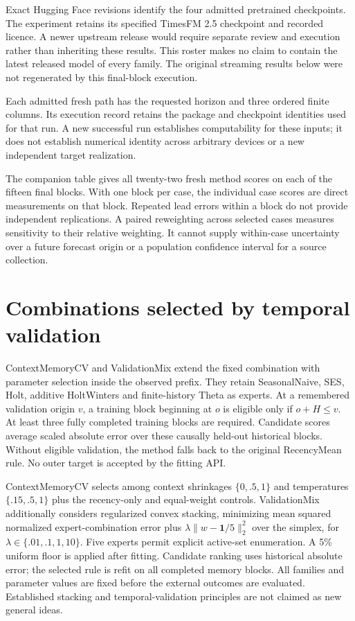 \documentclass[11pt,a4paper]{article}
\begin{document}
Exact Hugging Face revisions identify the four admitted pretrained checkpoints. The experiment retains its specified TimesFM 2.5 checkpoint and recorded licence. A newer upstream release would require separate review and execution rather than inheriting these results. This roster makes no claim to contain the latest released model of every family. The original streaming results below were not regenerated by this final-block execution.

Each admitted fresh path has the requested horizon and three ordered finite columns. Its execution record retains the package and checkpoint identities used for that run. A new successful run establishes computability for these inputs; it does not establish numerical identity across arbitrary devices or a new independent target realization.



The companion table  gives all twenty-two
fresh method scores on each of the fifteen final blocks. With one block per
case, the individual case scores are direct measurements on that block.
Repeated lead errors within a block do not provide independent replications.
A paired reweighting across selected cases measures sensitivity to their
relative weighting. It cannot supply within-case uncertainty over a future
forecast origin or a population confidence interval for a source collection.

\section{Combinations selected by temporal validation}
\label{sec:temporal-validation}
ContextMemoryCV and ValidationMix extend the fixed combination with parameter selection inside the observed prefix. They retain SeasonalNaive, SES, Holt, additive HoltWinters and finite-history Theta as experts. At a remembered validation origin $v$, a training block beginning at $o$ is eligible only if $o+H\le v$. At least three fully completed training blocks are required. Candidate scores average scaled absolute error over these causally held-out historical blocks. Without eligible validation, the method falls back to the original RecencyMean rule. No outer target is accepted by the fitting API.

ContextMemoryCV selects among context shrinkages $\{0,.5,1\}$ and temperatures $\{.15,.5,1\}$ plus the recency-only and equal-weight controls. ValidationMix additionally considers regularized convex stacking, minimizing mean squared normalized expert-combination error plus $\lambda\|w-\mathbf1/5\|_2^2$ over the simplex, for $\lambda\in\{.01,.1,1,10\}$. Five experts permit explicit active-set enumeration. A 5\% uniform floor is applied after fitting. Candidate ranking uses historical absolute error; the selected rule is refit on all completed memory blocks. All families and parameter values are fixed before the external outcomes are evaluated. Established stacking and temporal-validation principles are not claimed as new general ideas.
\end{document}

